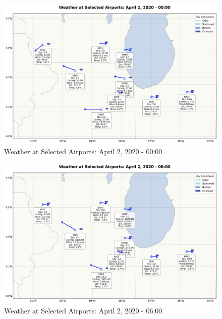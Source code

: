 \documentclass{article}
\begin{document}
\begin{figure}[H]
    \centering
    \includegraphics[width=\textwidth]{weather_map_00_00.png}
    \caption{Weather at Selected Airports: April 2, 2020 - 00:00}
    \label{fig:weather_00_00}
\end{figure}

\begin{figure}[H]
    \centering
    \includegraphics[width=\textwidth]{weather_map_06_00.png}
    \caption{Weather at Selected Airports: April 2, 2020 - 06:00}
    \label{fig:weather_06_00}
\end{figure}
\end{document}
